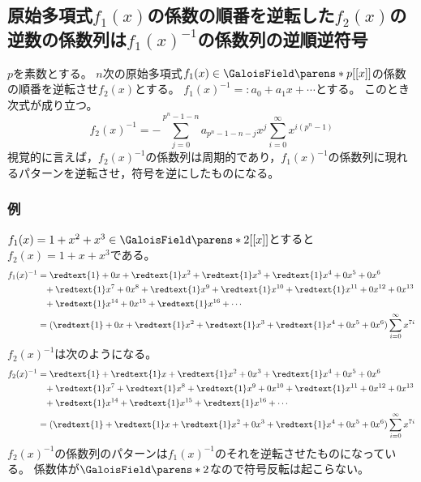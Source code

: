         \subsection{原始多項式\texorpdfstring{$f_1(x)$}{f1(x)}の係数の順番を逆転した\texorpdfstring{$f_2(x)$}{f2(x)}の逆数の係数列は\texorpdfstring{$f_1(x)^{-1}$}{1/f1(x)}の係数列の逆順逆符号}
            \begin{shadebox}
                $p$を素数とする。
                $n$次の原始多項式$f_1(x) \in \GaloisField\parens*{p}[[x]]$の係数の順番を逆転させ$f_2(x)$とする。
                $f_1(x)^{-1} =: a_0 + a_1x + \dotsb$とする。
                このとき次式が成り立つ。
                \[ f_2(x)^{-1} = -\sum_{j=0}^{p^n-1-n} a_{p^n-1-n-j}x^j \sum_{i=0}^\infty x^{i(p^n-1)} \]
                視覚的に言えば，$f_2(x)^{-1}$の係数列は周期的であり，$f_1(x)^{-1}$の係数列に現れるパターンを逆転させ，符号を逆にしたものになる。
            \end{shadebox}
            \subsubsection{例}
                $f_1(x) = 1+x^2+x^3 \in \GaloisField\parens*{2}[[x]]$とすると$f_2(x) = 1+x+x^3$である。
                \begin{align*}
                    f_1(x)^{-1} &= \redtext{1} + 0x + \redtext{1}x^2 + \redtext{1}x^3 + \redtext{1}x^4 + 0x^5 + 0x^6 \\
                    &\phantom{=}+ \redtext{1}x^7 + 0x^8 + \redtext{1}x^9 + \redtext{1}x^{10} + \redtext{1}x^{11} + 0x^{12} + 0x^{13} \\
                    &\phantom{=}+ \redtext{1}x^{14} + 0x^{15} + \redtext{1}x^{16} + \dotsb \\
                    &= (\redtext{1} + 0x + \redtext{1}x^2 + \redtext{1}x^3 + \redtext{1}x^4 + 0x^5 + 0x^6) \sum_{i=0}^\infty x^{7i}
                \end{align*}
                $f_2(x)^{-1}$は次のようになる。
                \begin{align*}
                    f_2(x)^{-1} &= \redtext{1} + \redtext{1}x + \redtext{1}x^2 + 0x^3 + \redtext{1}x^4 + 0x^5 + 0x^6 \\
                    &\phantom{=}+ \redtext{1}x^7 + \redtext{1}x^8 + \redtext{1}x^9 + 0x^{10} + \redtext{1}x^{11} + 0x^{12} + 0x^{13} \\
                    &\phantom{=}+ \redtext{1}x^{14} + \redtext{1}x^{15} + \redtext{1}x^{16} + \dotsb \\
                    &= (\redtext{1} + \redtext{1}x + \redtext{1}x^2 + 0x^3 + \redtext{1}x^4 + 0x^5 + 0x^6) \sum_{i=0}^\infty x^{7i}
                \end{align*}
                $f_2(x)^{-1}$の係数列のパターンは$f_1(x)^{-1}$のそれを逆転させたものになっている。
                係数体が$\GaloisField\parens*{2}$なので符号反転は起こらない。
